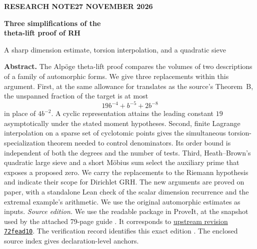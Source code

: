 \documentclass[11pt]{article}
\begin{document}
\thispagestyle{plain}
{\sffamily\footnotesize\bfseries\color{teal} RESEARCH NOTE\hfill 27 NOVEMBER 2026}\par
\vspace{6pt}
{\fontsize{24}{29}\selectfont\bfseries\color{ink} Three simplifications of the\\theta-lift proof of RH\par}
\vspace{5pt}
{\large A sharp dimension estimate, torsion interpolation, and a quadratic sieve}\par
\vspace{10pt}
\noindent\textbf{Abstract.}
The Alp\"oge theta-lift proof compares the volumes of two descriptions of a family of automorphic forms. We give three replacements within this argument. First, at the same allowance for translates as the source's Theorem~B, the unspanned fraction of the target is at most
\[
             19b^{-4}+b^{-5}+2b^{-8}
\]
in place of $4b^{-2}$. A cyclic representation attains the leading constant $19$ asymptotically under the stated moment hypotheses. Second, finite Lagrange interpolation on a sparse set of cyclotomic points gives the simultaneous torsion-specialization theorem needed to control denominators. Its order bound is independent of both the degrees and the number of tests. Third, Heath--Brown's quadratic large sieve and a short M\"obius sum select the auxiliary prime that exposes a proposed zero. We carry the replacements to the Riemann hypothesis and indicate their scope for Dirichlet GRH. The new arguments are proved on paper, with a standalone Lean check of the scalar dimension recurrence and the extremal example's arithmetic. We use the original automorphic estimates as inputs.
\vspace{2pt}
\tableofcontents
\vspace{3pt}
\noindent\textit{Source edition.} We use the readable package in ProveIt, at the snapshot used by the attached 79-page guide \cite{guide,archive}. It corresponds to \href{https://github.com/lsernau/grh-lean/tree/72fead102f663d5c7a407964a13dc0cf9d977207/grh}{upstream revision \texttt{72fead10}}. The verification record identifies this exact edition \cite{check}. The enclosed source index gives declaration-level anchors.
\newpage
\end{document}

